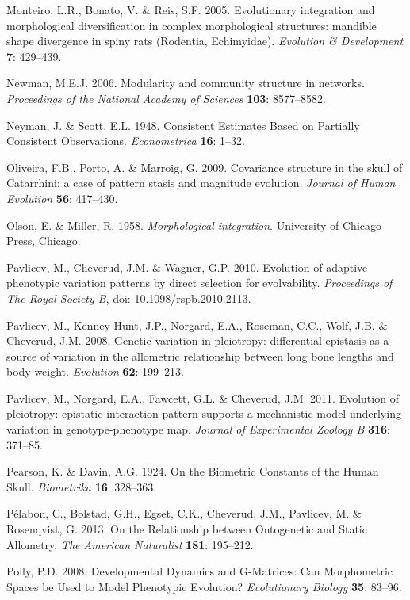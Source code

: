 \documentclass[12pt,]{article}
\begin{document}
Monteiro, L.R., Bonato, V. \& Reis, S.F. 2005. Evolutionary integration
and morphological diversification in complex morphological structures:
mandible shape divergence in spiny rats (Rodentia, Echimyidae).
\emph{Evolution \& Development} \textbf{7}: 429--439.

Newman, M.E.J. 2006. Modularity and community structure in networks.
\emph{Proceedings of the National Academy of Sciences} \textbf{103}:
8577--8582.

Neyman, J. \& Scott, E.L. 1948. Consistent Estimates Based on Partially
Consistent Observations. \emph{Econometrica} \textbf{16}: 1--32.

Oliveira, F.B., Porto, A. \& Marroig, G. 2009. Covariance structure in
the skull of Catarrhini: a case of pattern stasis and magnitude
evolution. \emph{Journal of Human Evolution} \textbf{56}: 417--430.

Olson, E. \& Miller, R. 1958. \emph{Morphological integration}.
University of Chicago Press, Chicago.

Pavlicev, M., Cheverud, J.M. \& Wagner, G.P. 2010. Evolution of adaptive
phenotypic variation patterns by direct selection for evolvability.
\emph{Proceedings of The Royal Society B}, doi:
\href{http://dx.doi.org/10.1098/rspb.2010.2113}{10.1098/rspb.2010.2113}.

Pavlicev, M., Kenney-Hunt, J.P., Norgard, E.A., Roseman, C.C., Wolf,
J.B. \& Cheverud, J.M. 2008. Genetic variation in pleiotropy:
differential epistasis as a source of variation in the allometric
relationship between long bone lengths and body weight. \emph{Evolution}
\textbf{62}: 199--213.

Pavlicev, M., Norgard, E.A., Fawcett, G.L. \& Cheverud, J.M. 2011.
Evolution of pleiotropy: epistatic interaction pattern supports a
mechanistic model underlying variation in genotype-phenotype map.
\emph{Journal of Experimental Zoology B} \textbf{316}: 371--85.

Pearson, K. \& Davin, A.G. 1924. On the Biometric Constants of the Human
Skull. \emph{Biometrika} \textbf{16}: 328--363.

Pélabon, C., Bolstad, G.H., Egset, C.K., Cheverud, J.M., Pavlicev, M. \&
Rosenqvist, G. 2013. On the Relationship between Ontogenetic and Static
Allometry. \emph{The American Naturalist} \textbf{181}: 195--212.

Polly, P.D. 2008. Developmental Dynamics and G-Matrices: Can
Morphometric Spaces be Used to Model Phenotypic Evolution?
\emph{Evolutionary Biology} \textbf{35}: 83--96.
\end{document}

